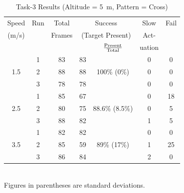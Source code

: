 \begin{table}
\centering\small
\begin{tabular}{|c|c|c|c|c|c|c|}
\hline
Speed & Run & Total & \multicolumn{2}{c|}{Success} & Slow & Fail\\
(m/s) &  & Frames  & \multicolumn{2}{c|}{\footnotesize (Target Present)}& Act-  &  \\
\cline{5-5} 
      &  &         &         & $\rm \frac{Present}{Total}$ & uation  & \\ 
\hline
    & 1 & 83 & 83 &    & 0 & 0 \\
1.5 & 2 & 88 & 88 & 100\% \scriptsize{(0\%)} & 0 & 0 \\
    & 3 & 78 & 78 &    & 0 & 0 \\
\hline
    & 1 & 85 & 67 &        & 0 & 18 \\
2.5 & 2 & 80 & 75 & 88.6\% \scriptsize{(8.5\%)} & 0 &  5 \\
    & 3 & 88 & 82 &        & 1 &  5 \\
\hline
    & 1 & 82 & 82 &        & 0 &  0 \\
3.5 & 2 & 85 & 59 & 89\% \scriptsize{(17\%)} & 1 & 25 \\
    & 3 & 86 & 84 &        & 2 &  0 \\
\hline
\end{tabular}
\begin{captext}
\centering \\[0.1cm] Figures in parentheses are standard deviations. \\
\end{captext}
\caption{Task-3 Results {\small (Altitude = 5~m, Pattern = Cross)}}
\label{tab:task3-results-5m-cross}
\end{table}

